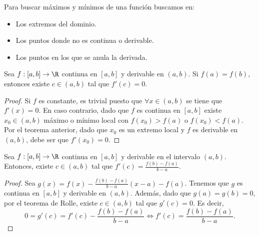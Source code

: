 \begin{observation}
\normalfont Para buscar máximos y mínimos de una función buscamos en:
\begin{itemize}
\item Los extremos del dominio.
\item Los puntos donde no es continua o derivable.
\item Los puntos en los que se anula la derivada.
\end{itemize}
\end{observation}
\begin{ftheorem}
	\normalfont Sea $\displaystyle f:[a,b] \to \R $ continua en $\displaystyle [a,b] $ y derivable en $\displaystyle \left(a,b\right) $. Si $\displaystyle f\left(a\right) = f\left(b\right) $, entonces existe $\displaystyle c \in \left(a,b\right) $ tal que $\displaystyle f'\left(c\right) = 0 $.
\end{ftheorem}
\begin{proof}
	Si $\displaystyle f $ es constante, es trivial puesto que $\displaystyle \forall x \in \left(a,b\right) $ se tiene que $\displaystyle f'\left(x\right) = 0 $. En caso contrario, dado que $\displaystyle f $ es continua en $\displaystyle \left[a,b\right]  $ existe $\displaystyle x_{0} \in \left(a,b\right) $ máximo o mínimo local con $\displaystyle f\left(x_{0}\right) > f\left(a\right) $ o $\displaystyle f\left(x_{0}\right) < f\left(a\right) $. Por el teorema anterior, dado que $\displaystyle x_{0} $ es un extremo local y $\displaystyle f $ es derivable en $\displaystyle \left(a,b\right) $, debe ser que $\displaystyle f'\left(x_{0}\right) = 0 $.
\end{proof}
\begin{ftheorem}
	\normalfont Sea $\displaystyle f : \left[a,b\right]  \to \R $ continua en $\displaystyle \left[a,b\right]  $ y derivable en el intervalo $\displaystyle \left(a,b\right) $. Entonces, existe $\displaystyle c \in \left(a,b\right) $ tal que $\displaystyle f'\left(c\right) = \frac{f\left(b\right)-f\left(a\right)}{b-a} $.
\end{ftheorem}
\begin{proof}
	Sea $\displaystyle g\left(x\right) = f\left(x\right) - \frac{f\left(b\right)-f\left(a\right)}{b-a}\left(x-a\right) - f\left(a\right) $. Tenemos que $\displaystyle g $ es continua en $\displaystyle \left[a,b\right]  $ y derivable en $\displaystyle \left(a,b\right) $. Además, dado que $\displaystyle g\left(a\right) = g\left(b\right) = 0 $, por el teorema de Rolle, existe $\displaystyle c \in \left(a,b\right) $ tal que $\displaystyle g'\left(c\right) = 0 $. Es decir,
	\[0 = g'\left(c\right) = f'\left(c\right) - \frac{f\left(b\right)-f\left(a\right)}{b-a} \iff f'\left(c\right) = \frac{f\left(b\right)-f\left(a\right)}{b-a} .\]
\end{proof}

